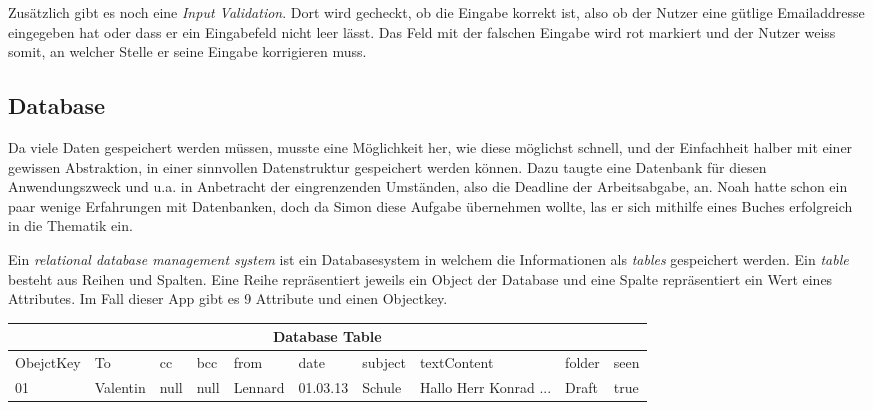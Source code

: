 \documentclass[a4paper,11pt]{article}
\begin{document}
Zusätzlich gibt es noch eine \textit{Input Validation}. Dort wird gecheckt, ob die Eingabe korrekt ist, also ob der Nutzer eine gütlige Emailaddresse eingegeben hat oder dass er ein Eingabefeld nicht leer lässt. Das Feld mit der falschen Eingabe wird rot markiert und der Nutzer weiss somit, an welcher Stelle er seine Eingabe korrigieren muss.

\subsection{Database}


Da viele Daten gespeichert werden müssen, musste eine Möglichkeit her, wie diese möglichst schnell, und der Einfachheit halber mit einer gewissen Abstraktion, in einer sinnvollen Datenstruktur gespeichert werden können. Dazu taugte eine Datenbank für diesen Anwendungszweck und u.a. in Anbetracht der eingrenzenden Umständen, also die Deadline der Arbeitsabgabe, an. Noah hatte schon ein paar wenige Erfahrungen mit Datenbanken, doch da Simon diese Aufgabe übernehmen wollte, las er sich mithilfe eines Buches erfolgreich in die Thematik ein.



Ein \textit{relational database management system} ist ein Databasesystem in welchem die Informationen als \textit{tables} gespeichert werden. 
Ein \textit{table} besteht aus Reihen und Spalten. Eine Reihe repräsentiert jeweils ein Object der Database und eine Spalte repräsentiert ein Wert eines Attributes. Im Fall dieser App
gibt es 9 Attribute und einen Objectkey. \\


\begin{tabular}{ |p{1.6cm}  |p{1.1cm} |p{1.1cm} |p{1.05cm} |p{1.15cm} |p{1.15cm} |p{1.25cm} |p{1.75cm} |p{1.25cm} |p{1.15cm}|}
 \hline
 \multicolumn{10}{|c|}{Database Table} \\
 \hline
    ObejctKey &To & cc & bcc & from & date & subject & textContent & folder & seen  \\
 \hline
     01    &Valentin& null & null & Lennard & 01.03.13 & Schule &  Hallo Herr Konrad ...& Draft & true \\
 \hline
\end{tabular} \\
\end{document}
